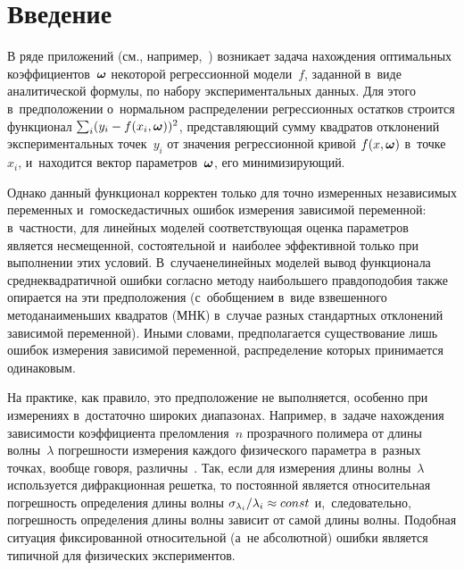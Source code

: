 




\thispagestyle{headings}

\begin{multicols}{2}

\label{st\stat}


\section{Введение}

\vspace*{-2pt}

В ряде приложений (см., например,~\cite{Gladun2004Labs,Rudoy15MonteCarlo})
возникает задача нахождения оптимальных
коэффициентов~$\boldsymbol{\omega}$ некоторой регрессионной модели~$f$, заданной
в~виде аналитической формулы, по набору экспериментальных данных. Для этого
в~предположении о~нормальном распределении регрессионных остатков
строится функционал $\sum\nolimits_i (y_i \hm- f(x_i, \bomega))^2$,
представляющий сумму квад\-ра\-тов отклонений экспериментальных точек~$y_i$ от
значения регрессионной кривой $f(x, \boldsymbol{\omega})$ в~точке~$x_i$,
и~находится вектор параметров~$\boldsymbol{\omega}$, его минимизирующий.

Однако данный функционал корректен только для точно измеренных независимых
переменных и~гомоскедастичных ошибок измерения зависимой переменной:
в~част\-ности, для линейных моделей соответствующая оценка параметров является
несмещенной, со\-сто\-ятель\-ной и~наиболее эффективной только при выполнении этих
условий. В~случае\linebreak нелинейных моделей вывод функционала среднеквадратичной
ошибки согласно методу наибольшего прав\-до\-по\-до\-бия также опирается на
эти предположения (с~обобщением в~виде взвешенного метода\linebreak наименьших
квад\-ра\-тов (МНК) в~случае разных стандартных отклонений зависимой
переменной).
Иными словами, предполагается существование лишь ошибок измерения зависимой
переменной, распределение которых принимается одинаковым.

На практике, как правило, это предположение не выполняется,
особенно при измерениях в~достаточно широких диапазонах.
Например, в~задаче на\-хож\-де\-ния за\-ви\-си\-мости коэффициента преломления~$n$ 
прозрачного
полимера от длины волны~$\lambda$ по\-греш\-ности измерения каждого физического
па\-ра\-мет\-ра в~разных точках, вообще говоря, различны~\cite{Rudoy15MonteCarlo}.
Так, если для измерения длины волны~$\lambda$ используется дифракционная
решетка, то постоянной является относительная погрешность определения длины 
волны
${\sigma_{\lambda_i}}/{\lambda_i} \hm\approx {const}$ и,~следовательно,
погрешность определения длины волны зависит от самой длины волны. Подобная 
ситуация
фиксированной относительной (а~не абсолютной) ошибки является типичной для
физических экспериментов.


\end{multicols}
